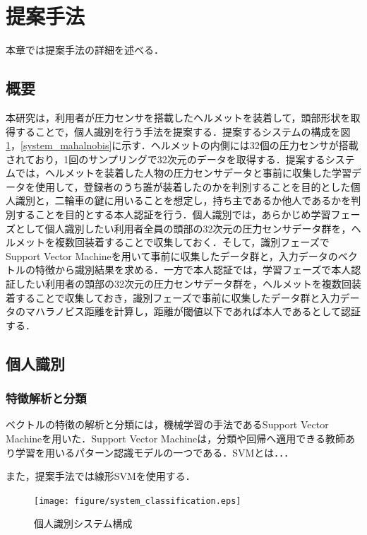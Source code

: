 \documentclass[Japanese,noauthor]{dicomopapers}
\begin{document}
\section{提案手法}
\label{method}
本章では提案手法の詳細を述べる．

\subsection{概要}
本研究は，利用者が圧力センサを搭載したヘルメットを装着して，頭部形状を取得することで，個人識別を行う手法を提案する．提案するシステムの構成を図\ref{system_classification}，\ref{system_mahalnobis}に示す．ヘルメットの内側には32個の圧力センサが搭載されており，1回のサンプリングで32次元のデータを取得する．提案するシステムでは，ヘルメットを装着した人物の圧力センサデータと事前に収集した学習データを使用して，登録者のうち誰が装着したのかを判別することを目的とした個人識別と，二輪車の鍵に用いることを想定し，持ち主であるか他人であるかを判別することを目的とする本人認証を行う．個人識別では，あらかじめ学習フェーズとして個人識別したい利用者全員の頭部の32次元の圧力センサデータ群を，ヘルメットを複数回装着することで収集しておく．そして，識別フェーズでSupport Vector Machineを用いて事前に収集したデータ群と，入力データのベクトルの特徴から識別結果を求める．一方で本人認証では，学習フェーズで本人認証したい利用者の頭部の32次元の圧力センサデータ群を，ヘルメットを複数回装着することで収集しておき，識別フェーズで事前に収集したデータ群と入力データのマハラノビス距離を計算し，距離が閾値以下であれば本人であるとして認証する．

\subsection{個人識別}
\subsubsection{特徴解析と分類}
ベクトルの特徴の解析と分類には，機械学習の手法であるSupport Vector Machineを用いた．Support Vector Machineは，分類や回帰へ適用できる教師あり学習を用いるパターン認識モデルの一つである．SVMとは．．．


また，提案手法では線形SVMを使用する．

\begin{figure}[!t]
  \centering
    \texttt{[image: figure/system\_classification.eps]}
  \caption{個人識別システム構成}
  \label{system_classification}
\end{figure}
\end{document}
